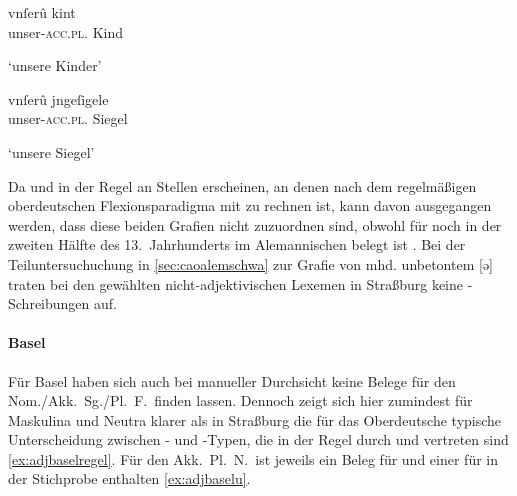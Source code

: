 \begin{exe}
\ex \label{ex:adjstrbgu}
	\begin{xlist}

	\ex \label{ex:adjstrbgu_3}
		\gll vnſerû kint \\
			unser-\textsc{acc.pl.\NeutX} Kind \\
		\begin{taggedline}{\parencites(Straßburg, 1297)[\pno~2663, 62.35]{cao4}}
		\trans `unsere Kinder'
		\end{taggedline}

	\ex \label{ex:adjstrbgu_4}
		\gll vnſerû jngeſigele \\
			unser-\textsc{acc.pl.\NeutI} Siegel \\
		\begin{taggedline}{\parencites(Straßburg, 1297)[\pno~2663, 63.25]{cao4}}
		\trans `unsere Siegel'
		\end{taggedline}
	\end{xlist}
\end{exe}

Da  und  in der Regel an Stellen erscheinen, an denen nach dem
regelmäßigen oberdeutschen Flexionsparadigma mit  zu rechnen ist,
kann davon ausgegangen werden, dass diese beiden Grafien nicht 
zuzuordnen sind, obwohl  für  noch in der zweiten Hälfte des
13.~Jahrhunderts im Alemannischen belegt ist
\autocites[41]{paul2007}[305]{ksw2}[vgl.~auch][466--467]{schirmunski1962}. Bei
der Teiluntersuchuchung in \cref{sec:caoalemschwa} zur Grafie von mhd.
unbetontem  [ə] traten bei den gewählten nicht-adjektivischen Lexemen
in Straßburg keine -Schreibungen auf.

\paragraph{Basel}
\label{par:adjbasel}
Für Basel haben sich auch bei manueller Durchsicht keine Belege für den
Nom./Akk.\ Sg./Pl.\ F.\ finden lassen. Dennoch zeigt sich hier zumindest für
Maskulina und Neutra klarer als in Straßburg die für das Oberdeutsche typische
Unterscheidung zwischen - und -Typen, die in der Regel durch
 und  vertreten sind \cref{ex:adjbaselregel}. Für den Akk.\
Pl.\ N.\ ist jeweils ein Beleg für  und einer für  in der
Stichprobe enthalten \cref{ex:adjbaselu}.

